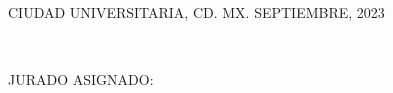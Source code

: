 \documentclass[11pt,letterpaper,twoside,openright]{report}
\begin{document}
\begin{titlepage}
\begin{center}
		\vspace{1.8cm}
		CIUDAD UNIVERSITARIA, CD. MX. SEPTIEMBRE, 2023\\
	\end{center}
	
\end{titlepage}


\newpage
\thispagestyle{empty}
$\ $


\newpage
\thispagestyle{empty}
\vspace{30mm}

\noindent JURADO ASIGNADO:
\vspace{8mm}
\end{document}
